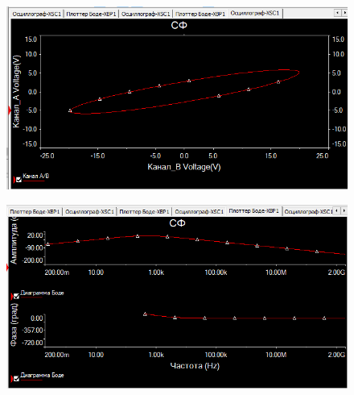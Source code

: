 \begin{figure}[ht]
\centering
\includegraphics[width=0.65\linewidth]{Pic/third_1.png}
\end{figure}


\begin{figure}[ht]
\centering
\includegraphics[width=0.65\linewidth]{Pic/third_2.png}
\end{figure}
\newpage
